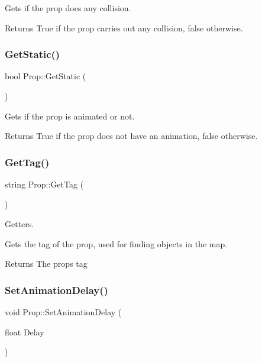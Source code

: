 Gets if the prop does any collision. 

\begin{DoxyReturn}{Returns}
True if the prop carries out any collision, false otherwise.
\end{DoxyReturn}
\mbox{\label{class_prop_a560525a45eae6c401f33cc699cbb7dec}} 
\subsubsection{\texorpdfstring{Get\+Static()}{GetStatic()}}
{\footnotesize\ttfamily bool Prop\+::\+Get\+Static (\begin{DoxyParamCaption}{ }\end{DoxyParamCaption})}



Gets if the prop is animated or not. 

\begin{DoxyReturn}{Returns}
True if the prop does not have an animation, false otherwise.
\end{DoxyReturn}
\mbox{\label{class_prop_a1fdb0adb8f604a33f029bc24c66c9740}} 
\subsubsection{\texorpdfstring{Get\+Tag()}{GetTag()}}
{\footnotesize\ttfamily string Prop\+::\+Get\+Tag (\begin{DoxyParamCaption}{ }\end{DoxyParamCaption})}



Getters. 

Gets the tag of the prop, used for finding objects in the map.

\begin{DoxyReturn}{Returns}
The props tag
\end{DoxyReturn}
\mbox{\label{class_prop_a7577e928046cad8d2217f1c68370d8cb}} 
\subsubsection{\texorpdfstring{Set\+Animation\+Delay()}{SetAnimationDelay()}}
{\footnotesize\ttfamily void Prop\+::\+Set\+Animation\+Delay (\begin{DoxyParamCaption}\item[{float}]{Delay }\end{DoxyParamCaption})}



